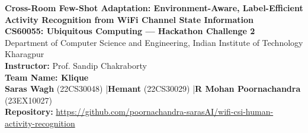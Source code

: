\documentclass[10pt,a4paper]{article}
\begin{document}
\begin{center}
    {\LARGE \textbf{Cross-Room Few-Shot Adaptation: Environment-Aware, Label-Efficient Activity Recognition from WiFi Channel State Information}}\\[1.5ex]
    {\large \textbf{CS60055: Ubiquitous Computing --- Hackathon Challenge 2}}\\[1.0ex]
    {\normalsize Department of Computer Science and Engineering, Indian Institute of Technology Kharagpur}\\[0.6ex]
    {\normalsize \textbf{Instructor:} Prof. Sandip Chakraborty}\\[1.5ex]
    {\large \textbf{Team Name: Klique}}\\[0.8ex]
    {\normalsize \textbf{Saras Wagh} (22CS30048) \quad|\quad \textbf{Hemant} (22CS30029) \quad|\quad \textbf{R Mohan Poornachandra} (23EX10027)}\\[1.0ex]
    {\small \textbf{Repository:} \url{https://github.com/poornachandra-sarasAI/wifi-csi-human-activity-recognition}}\\[1.5ex]
\end{center}
\end{document}
